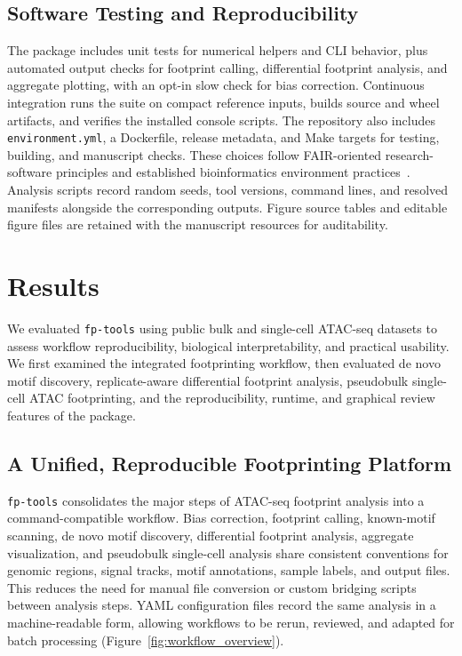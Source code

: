 \documentclass[biomedinformatics,article,submit,pdftex,moreauthors]{Definitions/mdpi}
\begin{document}
\subsection{Software Testing and Reproducibility}

The package includes unit tests for numerical helpers and CLI behavior, plus
automated output checks for footprint calling, differential footprint analysis,
and aggregate plotting, with an opt-in slow check for bias correction.
Continuous integration runs the suite on compact reference inputs, builds source
and wheel artifacts, and verifies the installed console scripts.
The repository also includes \texttt{environment.yml}, a Dockerfile, release
metadata, and Make targets for testing, building, and manuscript checks. These
choices follow FAIR-oriented research-software principles and established
bioinformatics environment practices~\cite{Wilkinson2016_FAIR,Gruning2018_Bioconda,Ewels2020_nfcore}.
Analysis scripts record random seeds, tool versions, command lines, and resolved
manifests alongside the corresponding outputs. Figure source tables and editable
figure files are retained with the manuscript resources for auditability.

\section{Results}

We evaluated \texttt{fp-tools} using public bulk and single-cell ATAC-seq
datasets to assess workflow reproducibility, biological interpretability, and
practical usability. We first examined the integrated footprinting workflow,
then evaluated de novo motif discovery, replicate-aware differential footprint
analysis, pseudobulk single-cell ATAC footprinting, and the reproducibility,
runtime, and graphical review features of the package.

\subsection{A Unified, Reproducible Footprinting Platform}

\texttt{fp-tools} consolidates the major steps of ATAC-seq footprint analysis
into a command-compatible workflow. Bias correction, footprint calling,
known-motif scanning, de novo motif discovery, differential footprint analysis,
aggregate visualization, and pseudobulk single-cell analysis share consistent
conventions for genomic regions, signal tracks, motif annotations, sample labels,
and output files. This reduces the need for manual file conversion or custom
bridging scripts between analysis steps. YAML configuration files record the same
analysis in a machine-readable form, allowing workflows to be rerun, reviewed,
and adapted for batch processing (Figure~\ref{fig:workflow_overview}).
\end{document}
